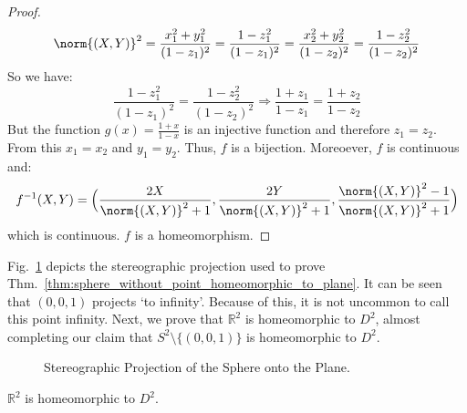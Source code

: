 \documentclass{article}                                                        %
\begin{document}
\begin{proof}
\begin{equation}
                \norm{(X,Y)}^{2}
                =\frac{x_{1}^2+y_{1}^2}{(1-z_{1})^{2}}
                =\frac{1-z_{1}^{2}}{(1-z_{1})^{2}}
                =\frac{x_{2}^{2}+y_{2}^{2}}{(1-z_{2})^{2}}
                =\frac{1-z_{2}^{2}}{(1-z_{2})^{2}}
            \end{equation}
            So we have:
            \begin{equation}
                \frac{1-z_{1}^{2}}{(1-z_{1})^{2}}
                =\frac{1-z_{2}^{2}}{(1-z_{2})^{2}}
                \Rightarrow
                \frac{1+z_{1}}{1-z_{1}}
                =\frac{1+z_{2}}{1-z_{2}}
            \end{equation}
            But the function $g(x)=\frac{1+x}{1-x}$ is an injective function
            and therefore $z_{1}=z_{2}$. From this $x_{1}=x_{2}$ and
            $y_{1}=y_{2}$. Thus, $f$ is a bijection. Moreoever,
            $f$ is continuous and:
            \begin{equation}
                f^{-1}(X,Y)
                =\Big(\frac{2X}{\norm{(X,Y)}^{2}+1},
                    \frac{2Y}{\norm{(X,Y)}^{2}+1},
                    \frac{\norm{(X,Y)}^{2}-1}{\norm{(X,Y)}^{2}+1}\Big)
            \end{equation}
            which is continuous. $f$ is a homeomorphism.
        \end{proof}
        Fig.~\ref{fig:stereographic_projection} depicts the stereographic
        projection used to prove
        Thm.~\ref{thm:sphere_without_point_homeomorphic_to_plane}.
        It can be seen that $(0,0,1)$ projects `to infinity'. Because of
        this, it is not uncommon to call this point infinity. Next, we
        prove that $\mathbb{R}^{2}$ is homeomorphic to $D^{2}$, almost
        completing our claim that $S^{2}\setminus\{(0,0,1)\}$
        is homeomorphic to $D^{2}$.
        \begin{figure}[H]
            \captionsetup{type=figure}
            \centering
            
            \caption{Stereographic Projection of the Sphere onto the Plane.}
            \label{fig:stereographic_projection}
        \end{figure}
        \begin{theorem}
            $\mathbb{R}^{2}$ is homeomorphic to $D^{2}$.
        \end{theorem}
\end{document}
